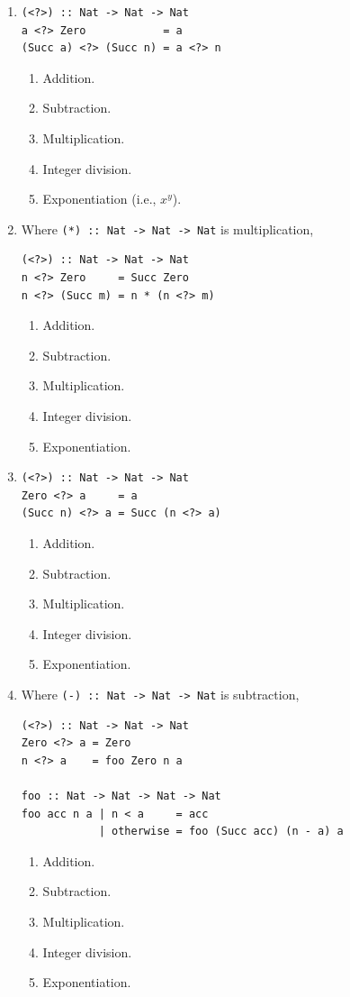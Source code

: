 \documentclass[12pt]{article}
\begin{document}
\begin{enumerate}[resume]
\item \begin{verbatim}
(<?>) :: Nat -> Nat -> Nat
a <?> Zero            = a
(Succ a) <?> (Succ n) = a <?> n
\end{verbatim}
\begin{enumerate}
\item Addition.
\item Subtraction.
\item Multiplication.
\item Integer division.
\item Exponentiation (i.e., $x^y$).
\end{enumerate}

\item Where {\tt (*) :: Nat -> Nat -> Nat} is multiplication,
\begin{verbatim}
(<?>) :: Nat -> Nat -> Nat
n <?> Zero     = Succ Zero
n <?> (Succ m) = n * (n <?> m)
\end{verbatim}
\begin{enumerate}
\item Addition.
\item Subtraction.
\item Multiplication.
\item Integer division.
\item Exponentiation.
\end{enumerate}

\pagebreak

\item \begin{verbatim}
(<?>) :: Nat -> Nat -> Nat
Zero <?> a     = a
(Succ n) <?> a = Succ (n <?> a)
\end{verbatim}
\begin{enumerate}
\item Addition.
\item Subtraction.
\item Multiplication.
\item Integer division.
\item Exponentiation.
\end{enumerate}

\item Where {\tt (-) :: Nat -> Nat -> Nat} is subtraction,
\begin{verbatim}
(<?>) :: Nat -> Nat -> Nat
Zero <?> a = Zero
n <?> a    = foo Zero n a

foo :: Nat -> Nat -> Nat -> Nat
foo acc n a | n < a     = acc
            | otherwise = foo (Succ acc) (n - a) a
\end{verbatim}
\begin{enumerate}
\item Addition.
\item Subtraction.
\item Multiplication.
\item Integer division.
\item Exponentiation.
\end{enumerate}


\end{enumerate}
\end{document}
